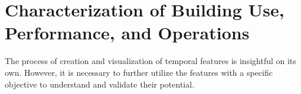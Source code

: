 \section{Characterization of Building Use, Performance, and Operations}
\label{sec:characterization}

The process of creation and visualization of temporal features is insightful on its own. However, it is necessary to further utilize the features with a specific objective to understand and validate their potential. 